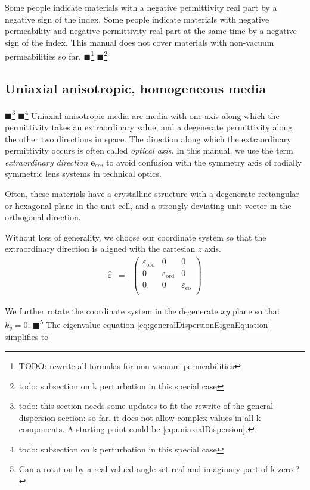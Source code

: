 \documentclass[12pt,a4paper,twoside,openright,BCOR10mm,headsepline,titlepage,abstracton,chapterprefix,final]{scrreprt}
\newcommand\Vector[1]{{\mathbf{#1}}}
\newcommand\wavenumber{k}
\newcommand\Tensor[1]{\hat{#1}}
\newcommand\permittivity{\Tensor{\scalarpermittivity}}
\newcommand\scalarpermittivity{\varepsilon}
\newcommand\ordi{\text{ord}}
\newcommand\eo{\text{eo}}
\newcommand{\remark}[1]{{\color{red}$\blacksquare$}\footnote{{\color{red}#1}}}
\begin{document}
Some people indicate materials with a negative permittivity real part by a negative sign of the index.
Some people indicate materials with negative permeability and negative permittivity real part at the same time by a negative sign of the index.
This manual does not cover materials with non-vacuum permeabilities so far.
\remark{TODO: rewrite all formulas for non-vacuum permeabilities}
\remark{todo: subsection on k perturbation in this special case}


\subsection{Uniaxial anisotropic, homogeneous media}
\remark{todo: this section needs some updates to fit the rewrite of the general dispersion section: so far, it does not allow complex values in all k components. A starting point could be \ref{eq:uniaxialDispersion}.}
\remark{todo: subsection on k perturbation in this special case}
Uniaxial anisotropic media are media with one axis along which the permittivity takes an extraordinary value, 
and a degenerate permittivity along the other two directions in space.
The direction along which the extraordinary permittivity occurs is often called \emph{optical axis}. 
In this manual, we use the term \emph{extraordinary direction} $\Vector{e}_{eo}$, to avoid confusion with the symmetry axis of radially symmetric lens systems in technical optics.

Often, these materials have a crystalline structure with a degenerate rectangular or hexagonal plane in the unit cell, 
and a strongly deviating unit vector in the orthogonal direction. 

Without loss of generality, we choose our coordinate system so that the extraordinary direction is aligned with the cartesian $z$ axis.
\begin{eqnarray}
 \permittivity &=&
 \begin{pmatrix}
  \scalarpermittivity_{\ordi}  & 0 & 0 \\
  0 & \scalarpermittivity_{\ordi}  & 0 \\
  0 & 0 & \scalarpermittivity_{\eo}   \\
 \end{pmatrix}
\end{eqnarray}

We further rotate the coordinate system in the degenerate $xy$ plane so that $\wavenumber_y = 0$.
\remark{Can a rotation by a real valued angle set real and imaginary part of k zero ?}
The eigenvalue equation \ref{eq:generalDispersionEigenEquation} simplifies to
\end{document}
